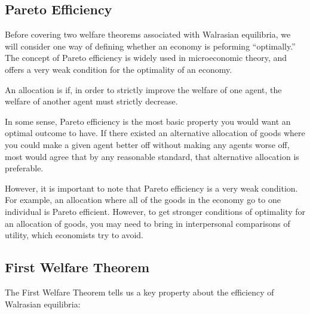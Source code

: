 \subsection*{Pareto Efficiency}
Before covering two welfare theorems associated with Walrasian equilibria, we will consider one way of defining whether an economy is peforming ``optimally.'' The concept of Pareto efficiency is widely used in microeconomic theory, and offers a very weak condition for the optimality of an economy.

\begin{definition*}
    An allocation is  if, in order to strictly improve the welfare of one agent, the welfare of another agent must strictly decrease. 
\end{definition*}
In some sense, Pareto efficiency is the most basic property you would want an optimal outcome to have. If there existed an alternative allocation of goods where you could make a given agent better off without making any agents worse off, most would agree that by any reasonable standard, that alternative allocation is preferable. 

However, it is important to note that Pareto efficiency is a very weak condition. For example, an allocation where all of the goods in the economy go to one individual is Pareto efficient. However, to get stronger conditions of optimality for an allocation of goods, you may need to bring in interpersonal comparisons of utility, which economists try to avoid. 

\subsection*{First Welfare Theorem}
The First Welfare Theorem tells us a key property about the efficiency of Walrasian equilibria:

